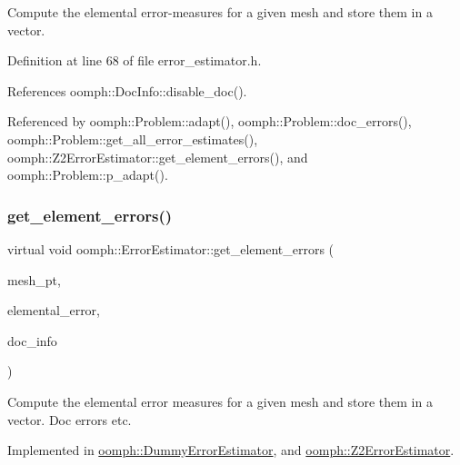 Compute the elemental error-\/measures for a given mesh and store them in a vector. 



Definition at line 68 of file error\+\_\+estimator.\+h.



References oomph\+::\+Doc\+Info\+::disable\+\_\+doc().



Referenced by oomph\+::\+Problem\+::adapt(), oomph\+::\+Problem\+::doc\+\_\+errors(), oomph\+::\+Problem\+::get\+\_\+all\+\_\+error\+\_\+estimates(), oomph\+::\+Z2\+Error\+Estimator\+::get\+\_\+element\+\_\+errors(), and oomph\+::\+Problem\+::p\+\_\+adapt().

\mbox{\label{classoomph_1_1ErrorEstimator_a77e85262d309d6e7da0ca71e98b7afff}} 
\subsubsection{\texorpdfstring{get\+\_\+element\+\_\+errors()}{get\_element\_errors()}\hspace{0.1cm}{\footnotesize\ttfamily [2/2]}}
{\footnotesize\ttfamily virtual void oomph\+::\+Error\+Estimator\+::get\+\_\+element\+\_\+errors (\begin{DoxyParamCaption}\item[{\hyperlink{classoomph_1_1Mesh}{Mesh} $\ast$\&}]{mesh\+\_\+pt,  }\item[{\hyperlink{classoomph_1_1Vector}{Vector}$<$ double $>$ \&}]{elemental\+\_\+error,  }\item[{\hyperlink{classoomph_1_1DocInfo}{Doc\+Info} \&}]{doc\+\_\+info }\end{DoxyParamCaption})\hspace{0.3cm}{\ttfamily [pure virtual]}}



Compute the elemental error measures for a given mesh and store them in a vector. Doc errors etc. 



Implemented in \hyperlink{classoomph_1_1DummyErrorEstimator_a471038816556f1af7602cadbbb21d8fb}{oomph\+::\+Dummy\+Error\+Estimator}, and \hyperlink{classoomph_1_1Z2ErrorEstimator_ae0fd03123c518ed340bb534c2f6b8cc4}{oomph\+::\+Z2\+Error\+Estimator}.

